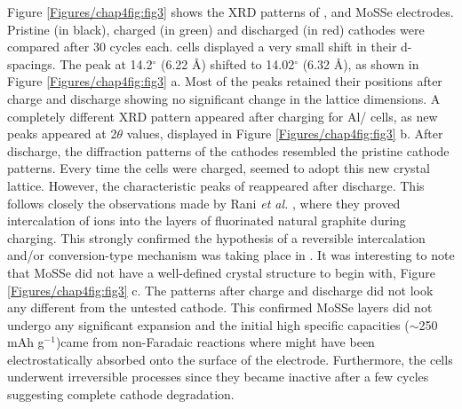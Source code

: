 Figure \ref{Figures/chap4fig:fig3} shows the XRD patterns of ,  and MoSSe electrodes. Pristine (in black), charged (in green) and discharged (in red) cathodes were compared after 30 cycles each.  cells displayed a very small shift in their d-spacings. The peak at 14.2$^{\circ}$ (6.22 \AA) shifted to 14.02$^{\circ}$ (6.32 \AA), as shown in Figure \ref{Figures/chap4fig:fig3} a. Most of the peaks retained their positions after charge and discharge showing no significant change in the lattice dimensions. A completely different XRD pattern appeared after charging for Al/ cells, as new peaks appeared at 2$\theta$ values, displayed in Figure \ref{Figures/chap4fig:fig3} b. After discharge, the diffraction patterns of the cathodes resembled the pristine cathode patterns. Every time the cells were charged,  seemed to adopt this new crystal lattice. However, the characteristic peaks of  reappeared after discharge. This follows closely the observations made by Rani \textit{et al.} \cite{rani_fluorinated_2013}, where they proved intercalation of ions into the layers of fluorinated natural graphite during charging. This strongly confirmed the hypothesis of a reversible intercalation and/or conversion-type mechanism was taking place in . It was interesting to note that MoSSe did not have a well-defined crystal structure to begin with, Figure \ref{Figures/chap4fig:fig3} c. The patterns after charge and discharge did not look any different from the untested cathode. This confirmed MoSSe layers did not undergo any significant expansion and the initial high specific capacities ($\sim$250 mAh g$^{-1}$)came from non-Faradaic reactions where  might have been electrostatically absorbed onto the surface of the electrode. Furthermore, the cells underwent irreversible processes since they became inactive after a few cycles suggesting complete cathode degradation. 
